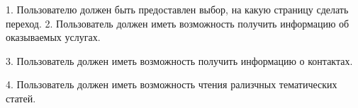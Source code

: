 \hspace{1.25cm}1.	Пользователю должен быть предоставлен выбор, на какую страницу сделать переход.
2.	Пользователь должен иметь возможность получить информацию об оказываемых услугах.

3.	Пользователь должен иметь возможность получить информацию о контактах.

4.	Пользователь должен иметь возможность чтения рализчных тематических статей.
